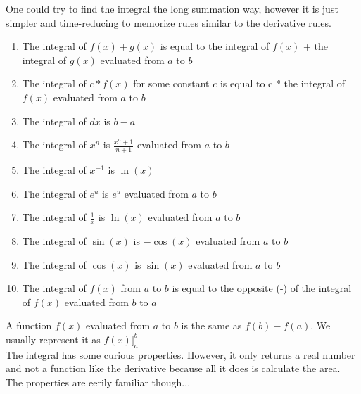\documentclass[../revisedmain.tex]{subfiles}
\begin{document}
One could try to find the integral the long summation way, however it is just simpler and time-reducing to memorize rules similar to the derivative rules.
\begin{enumerate}
	\item The integral of $f(x)+g(x)$ is equal to the integral of $f(x)$ + the integral of $g(x)$ evaluated from $a$ to $b$
	\item The integral of $c*f(x)$ for some constant $c$ is equal to c * the integral of $f(x)$ evaluated from $a$ to $b$
	\item The integral of $dx$ is $b-a$
	\item The integral of $x^n$ is $\displaystyle\frac{x^n+1}{n+1}$ evaluated from $a$ to $b$
	\item The integral of $x^{-1}$ is $\ln(x)$
	\item The integral of $e^u$ is $e^u$ evaluated from $a$ to $b$
	\item The integral of $\displaystyle\frac{1}{x}$ is $\ln(x)$ evaluated from $a$ to $b$
	\item The integral of $\sin(x)$ is $-\cos(x)$ evaluated from $a$ to $b$
	\item The integral of $\cos(x)$ is $\sin(x)$ evaluated from $a$ to $b$
	\item The integral of $f(x)$ from $a$ to $b$ is equal to the opposite (-) of the integral of $f(x)$ evaluated from $b$ to $a$
\end{enumerate}
A function $f(x)$ evaluated from $a$ to $b$ is the same as $f(b)-f(a)$. We usually represent it as $f(x)]_a^b$ \\The integral has some curious properties. However, it only returns a real number and not a function like the derivative because all it does is calculate the area.	The properties are eerily familiar though...\\
\end{document}
